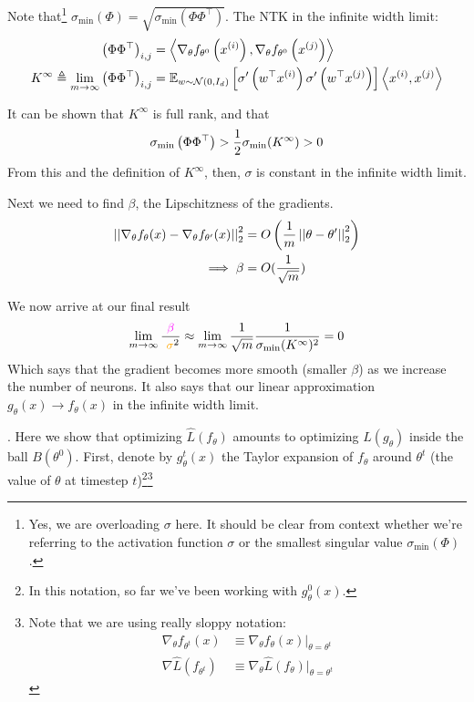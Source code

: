 \documentclass[11pt]{article}
\newcommand{\ntknabla}[1]{\nabla_{\theta} f_{\theta^0}\left( #1 \right)}
\begin{document}
\begin{compactenum}
\begin{compactenum}
		\item Note that\footnote{Yes, we are overloading $\sigma$ here. It should be clear from context whether we're referring to the activation function $\sigma$ or the smallest singular value $\sigma_{\min}(\Phi)$.} $\sigma_{\min}(\Phi) = \sqrt{\sigma_{\min}(\Phi \Phi^\top)}$. The NTK in the infinite width limit:
		\begin{align}
			\lr{\Phi \Phi^\top}_{i, j}
				&= \innerprod{ \ntknabla{\ival[i]{x}} }{ \ntknabla{\ival[j]{x}} } \\
			K^{\infty} \triangleq \lim_{m \to \infty} 	\lr{\Phi \Phi^\top}_{i, j}
				&=  \E[w \sim \Gauss{0, I_d}]{  \sigma'\lr{w^\top \ival[i]{x}} \sigma'\lr{w^\top \ival[j]{x}} } \innerprod{\ival[i]{x}}{\ival[j]{x}}
		\end{align}
	
		\item It can be shown that $K^{\infty}$ is full rank, and that
		\begin{align}
			\sigma_{\min}\left(  \Phi \Phi^\top  \right) > \frac{1}{2} \sigma_{\min}(K^{\infty}) > 0
		\end{align}
		From this and the definition of $K^{\infty}$, then, $\sigma$ is constant in the infinite width limit. 
		
		\item Next we need to find $\beta$, the Lipschitzness of the gradients. 
		\begin{align}
			\left|\left| \nabla_{\theta}f_{\theta}(x)  - \nabla_{\theta}f_{\theta'}(x)  \right|\right|_{2}^2	
				&= O\left( \frac{1}{m} \left|\left| \theta - \theta' \right|\right|_{2}^2 \right) \\
			\implies \beta
				&= O(\frac{1}{\sqrt m})
		\end{align}
	
		\item We now arrive at our final result
		\begin{align}
			\lim_{m \to \infty} \frac{\mpink \beta}{\morange \sigma^2}	
				\approx \lim_{m \to \infty}  \inv{\sqrt{m}} \inv{\sigma_{\min}(K^{\infty})^2} 
				= 0
		\end{align}
		Which says that the gradient becomes more smooth (smaller $\beta$) as we increase the number of neurons. It also says that our linear approximation $g_{\theta}(x) \to f_{\theta}(x)$ in the infinite width limit. 
	\end{compactenum}
\end{compactenum}


. Here we show that optimizing $\hat L(f_{\theta})$ amounts to optimizing $\hat L(g_{\theta})$ inside the ball $B(\theta^0)$. First, denote by $g_{\theta}^t(x)$ the Taylor expansion of $f_{\theta}$ around $\theta^t$ (the value of $\theta$ at timestep $t$)\footnote{In this notation, so far we've been working with $g^0_{\theta}(x)$.}\footnote{Note that we are using really sloppy notation:
	\begin{align}
	\nabla_{\theta} f_{\theta^t}(x) 
		&\equiv \nabla_{\theta} f_{\theta}(x) \bigg|_{\theta = \theta^t} \\
	\nabla \hat L (f_{\theta^t}) 
		&\equiv \nabla_{\theta} \hat L(f_{\theta}) \bigg|_{\theta=\theta^t}
	\end{align}
}
\end{document}
